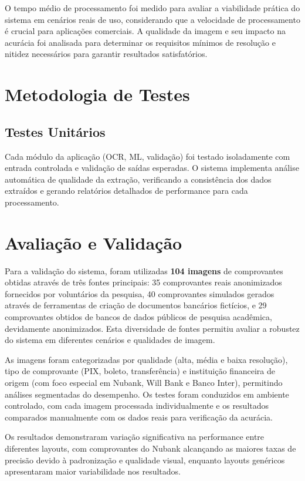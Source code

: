 O tempo médio de processamento foi medido para avaliar a viabilidade prática do sistema em cenários reais de uso, considerando que a velocidade de processamento é crucial para aplicações comerciais. A qualidade da imagem e seu impacto na acurácia foi analisada para determinar os requisitos mínimos de resolução e nitidez necessários para garantir resultados satisfatórios.

\section{Metodologia de Testes}

\subsection{Testes Unitários}

Cada módulo da aplicação (OCR, ML, validação) foi testado isoladamente com entrada controlada e validação de saídas esperadas. O sistema implementa análise automática de qualidade da extração, verificando a consistência dos dados extraídos e gerando relatórios detalhados de performance para cada processamento.

\section{Avaliação e Validação}

Para a validação do sistema, foram utilizadas \textbf{104 imagens} de comprovantes obtidas através de três fontes principais: 35 comprovantes reais anonimizados fornecidos por voluntários da pesquisa, 40 comprovantes simulados gerados através de ferramentas de criação de documentos bancários fictícios, e 29 comprovantes obtidos de bancos de dados públicos de pesquisa acadêmica, devidamente anonimizados. Esta diversidade de fontes permitiu avaliar a robustez do sistema em diferentes cenários e qualidades de imagem.

As imagens foram categorizadas por qualidade (alta, média e baixa resolução), tipo de comprovante (PIX, boleto, transferência) e instituição financeira de origem (com foco especial em Nubank, Will Bank e Banco Inter), permitindo análises segmentadas do desempenho. Os testes foram conduzidos em ambiente controlado, com cada imagem processada individualmente e os resultados comparados manualmente com os dados reais para verificação da acurácia.

Os resultados demonstraram variação significativa na performance entre diferentes layouts, com comprovantes do Nubank alcançando as maiores taxas de precisão devido à padronização e qualidade visual, enquanto layouts genéricos apresentaram maior variabilidade nos resultados.

